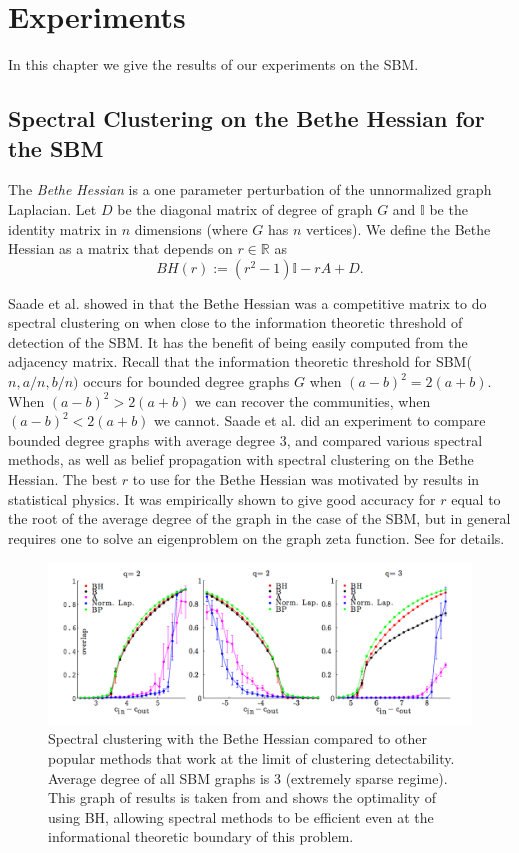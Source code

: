 \chapter{Experiments}

In this chapter we give the results of our experiments on the SBM.  
\section{Spectral Clustering on the Bethe Hessian for the SBM}
\begin{definition}The 
\textit{Bethe Hessian} is a one parameter perturbation of the unnormalized graph Laplacian.  Let $D$ be the diagonal matrix of degree of graph $G$ and $\mathbb{I}$ be the identity matrix in $n$ dimensions (where $G$ has $n$ vertices).  We define the Bethe Hessian as a matrix that depends on $r \in \mathbb{R}$ as  $$BH(r) := (r^2-1)\mathbb{I} - rA +D.$$
\end{definition}

Saade et al. showed in \cite{AFL} that the Bethe Hessian was a competitive matrix to do spectral clustering on when close to the information theoretic threshold of detection of the SBM.  It has the benefit of being easily computed from the adjacency matrix. Recall that the information theoretic threshold for SBM($n, a/n, b/n)$ occurs for bounded degree graphs $G$ when $(a-b)^2 = 2(a+b)$.  When $(a-b)^2 > 2(a+b)$ we can recover the communities, when $(a-b)^2 < 2(a+b)$ we cannot.  Saade et al. did an experiment to compare bounded degree graphs with average degree 3, and compared various spectral methods, as well as belief propagation with spectral clustering on the Bethe Hessian. The best $r$ to use for the Bethe Hessian was motivated by results in statistical physics. It was empirically shown to give good accuracy for $r$ equal to the root of the average degree of the graph in the case of the SBM, but in general requires one to solve an eigenproblem on the graph zeta function.  See \cite{AFL} for details. 

\begin{figure}[h]
  \begin{center}
  \includegraphics[scale=0.4]{BH_SBM.png}
  \caption{Spectral clustering with the Bethe Hessian compared to other popular methods that work at the limit of clustering detectability. Average degree of all SBM graphs is 3 (extremely sparse regime). This graph of results is taken from \cite{AFL} and shows the optimality of using BH, allowing spectral methods to be efficient even at the informational theoretic boundary of this problem.}
  \end{center}
\end{figure}

